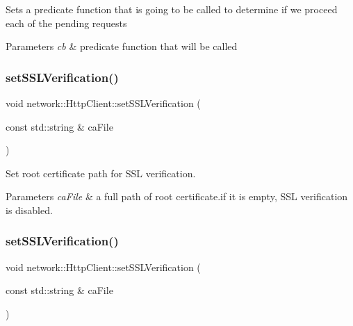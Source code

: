 Sets a predicate function that is going to be called to determine if we proceed each of the pending requests


\begin{DoxyParams}{Parameters}
{\em cb} & predicate function that will be called \\
\hline
\end{DoxyParams}
\mbox{\label{classnetwork_1_1HttpClient_a55b52ba7821dd0520eed769123df1f16}} 
\subsubsection{\texorpdfstring{set\+S\+S\+L\+Verification()}{setSSLVerification()}\hspace{0.1cm}{\footnotesize\ttfamily [1/2]}}
{\footnotesize\ttfamily void network\+::\+Http\+Client\+::set\+S\+S\+L\+Verification (\begin{DoxyParamCaption}\item[{const std\+::string \&}]{ca\+File }\end{DoxyParamCaption})}

Set root certificate path for S\+SL verification.


\begin{DoxyParams}{Parameters}
{\em ca\+File} & a full path of root certificate.\+if it is empty, S\+SL verification is disabled. \\
\hline
\end{DoxyParams}
\mbox{\label{classnetwork_1_1HttpClient_a55b52ba7821dd0520eed769123df1f16}} 
\subsubsection{\texorpdfstring{set\+S\+S\+L\+Verification()}{setSSLVerification()}\hspace{0.1cm}{\footnotesize\ttfamily [2/2]}}
{\footnotesize\ttfamily void network\+::\+Http\+Client\+::set\+S\+S\+L\+Verification (\begin{DoxyParamCaption}\item[{const std\+::string \&}]{ca\+File }\end{DoxyParamCaption})}

